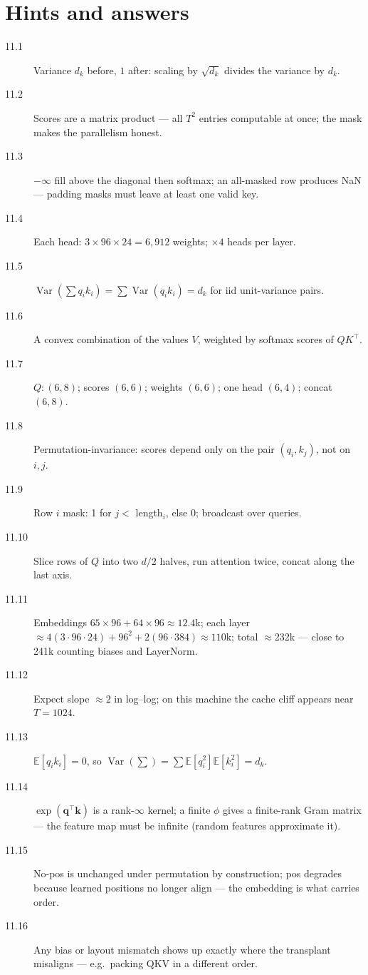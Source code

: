 \section*{Hints and answers}
\begin{description}
\item[11.1] Variance $d_k$ before, $1$ after: scaling by
$\sqrt{d_k}$ divides the variance by $d_k$.
\item[11.2] Scores are a matrix product --- all $T^2$ entries
computable at once; the mask makes the parallelism honest.
\item[11.3] $-\infty$ fill above the diagonal then softmax; an
all-masked row produces NaN --- padding masks must leave at least
one valid key.
\item[11.4] Each head: $3\times96\times24=6{,}912$ weights;
$\times4$ heads per layer.
\item[11.5] $\operatorname{Var}(\sum q_ik_i)=\sum
\operatorname{Var}(q_ik_i)=d_k$ for iid unit-variance pairs.
\item[11.6] A convex combination of the values $V$, weighted by
softmax scores of $QK^\top$.
\item[11.7] $Q:(6,8)$; scores $(6,6)$; weights $(6,6)$; one head
$(6,4)$; concat $(6,8)$.
\item[11.8] Permutation-invariance: scores depend only on the pair
$(q_i,k_j)$, not on $i,j$.
\item[11.9] Row $i$ mask: 1 for $j<$ length$_i$, else 0; broadcast
over queries.
\item[11.10] Slice rows of $Q$ into two $d/2$ halves, run attention
twice, concat along the last axis.
\item[11.11] Embeddings $65\times96+64\times96\approx12.4$k;
each layer $\approx4(3{\cdot}96{\cdot}24)+96^2+2(96{\cdot}384)\approx
110$k; total $\approx$232k --- close to 241k counting biases and
LayerNorm.
\item[11.12] Expect slope $\approx2$ in log--log; on this machine
the cache cliff appears near $T{=}1024$.
\item[11.13] $\mathbb E[q_ik_i]=0$, so
$\operatorname{Var}(\sum)=\sum\mathbb E[q_i^2]\mathbb E[k_i^2]=d_k$.
\item[11.14] $\exp(\mathbf q^\top\mathbf k)$ is a rank-$\infty$
kernel; a finite $\phi$ gives a finite-rank Gram matrix --- the
feature map must be infinite (random features approximate it).
\item[11.15] No-pos is unchanged under permutation by construction;
pos degrades because learned positions no longer align --- the
embedding is what carries order.
\item[11.16] Any bias or layout mismatch shows up exactly where the
transplant misaligns --- e.g.\ packing QKV in a different order.
\end{description}
